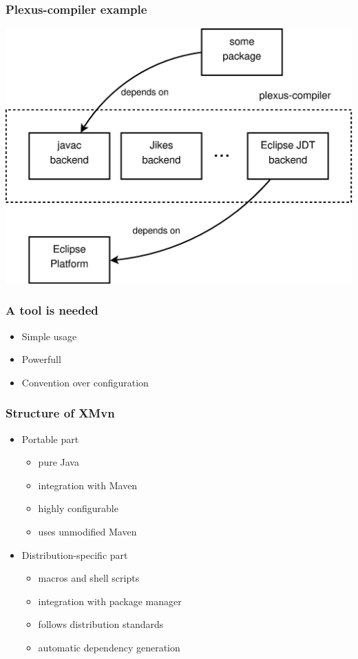 \documentclass[pdftex,unicode,xcolor=table]{beamer}
\begin{document}
\begin{frame}[fragile]
  \frametitle{Plexus-compiler example}
  \begin{center}
    \includegraphics[scale=0.3]{plexus-compiler.eps}
  \end{center}
\end{frame}

\begin{frame}
  \frametitle{A tool is needed}
  \begin{itemize}
    \item Simple usage
    \item Powerfull
    \item Convention over configuration
  \end{itemize}
\end{frame}

\begin{frame}
  \frametitle{Structure of XMvn}
  \begin{itemize}
    \item Portable part
    \begin{itemize}
      \item pure Java
      \item integration with Maven
      \item highly configurable
      \item uses unmodified Maven
    \end{itemize}
    \item Distribution-specific part
    \begin{itemize}
      \item macros and shell scripts
      \item integration with package manager
      \item follows distribution standards
      \item automatic dependency generation
    \end{itemize}
  \end{itemize}
\end{frame}
\end{document}
